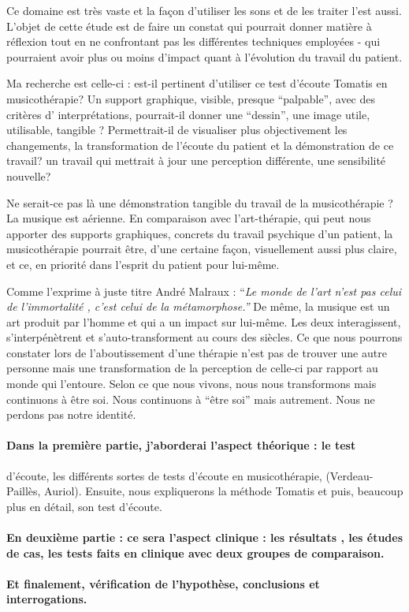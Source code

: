 Ce domaine est très vaste et la façon d'utiliser les sons et de les
traiter l'est aussi. L'objet de cette étude est de faire un constat
qui pourrait donner matière à réflexion tout en ne confrontant pas
les différentes techniques employées - qui pourraient avoir plus ou
moins d'impact quant à l'évolution du travail du patient.

Ma recherche est celle-ci : est-il pertinent d'utiliser ce test d'écoute
Tomatis en musicothérapie? Un support graphique, visible, presque
``palpable'', avec des critères d' interprétations, pourrait-il
donner une ``dessin'', une image utile, utilisable, tangible ? Permettrait-il
de visualiser plus objectivement les changements, la transformation
de l'écoute du patient et la démonstration de ce travail? un travail
qui mettrait à jour une perception différente, une sensibilité nouvelle?

Ne serait-ce pas là une démonstration tangible du travail de la musicothérapie
? La musique est aérienne. En comparaison avec l'art-thérapie, qui
peut nous apporter des supports graphiques, concrets du travail psychique
d'un patient, la musicothérapie pourrait être, d'une certaine façon,
visuellement aussi plus claire, et ce, en priorité dans l'esprit du
patient pour lui-même. 

Comme l'exprime à juste titre André Malraux : ``\emph{Le monde de
l'art n'est pas celui de l'immortalité , c'est celui de la métamorphose.''}
De même, la musique est un art produit par l'homme et qui a un impact
sur lui-même. Les deux interagissent, s'interpénètrent et s'auto-transforment
au cours des siècles. Ce que nous pourrons constater lors de l'aboutissement
d'une thérapie n'est pas de trouver une autre personne mais une transformation
de la perception de celle-ci par rapport au monde qui l'entoure. Selon
ce que nous vivons, nous nous transformons mais continuons à être
soi. Nous continuons à ``être soi'' mais autrement. Nous ne perdons
pas notre identité.

\paragraph{Dans la première partie, j'aborderai l'aspect théorique : le test}
d'écoute, les différents sortes de tests d'écoute en musicothérapie, (Verdeau-Paillès, Auriol). Ensuite, nous expliquerons la méthode Tomatis
et puis, beaucoup plus en détail, son test d'écoute.

\paragraph{En deuxième partie : ce sera l'aspect clinique : les résultats ,
les études de cas, les tests faits en clinique avec deux groupes de
comparaison.}

\paragraph{Et finalement, vérification de l'hypothèse, conclusions et interrogations.}
